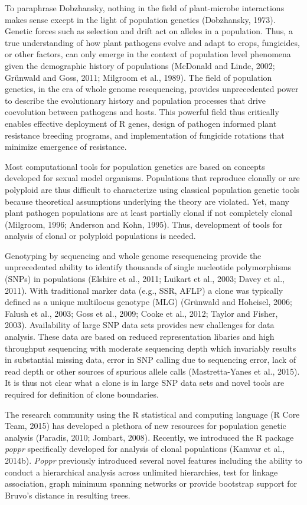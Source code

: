 \documentclass{frontiersSCNS} %
\begin{document}
To paraphrase Dobzhansky, nothing in the field of plant-microbe
interactions makes sense except in the light of population genetics
(Dobzhansky, 1973). Genetic forces such as selection and drift act on
alleles in a population. Thus, a true understanding of how plant
pathogens evolve and adapt to crops, fungicides, or other factors, can
only emerge in the context of population level phenomena given the
demographic history of populations (McDonald and Linde, 2002; Grünwald
and Goss, 2011; Milgroom et al., 1989). The field of population
genetics, in the era of whole genome resequencing, provides
unprecedented power to describe the evolutionary history and population
processes that drive coevolution between pathogens and hosts. This
powerful field thus critically enables effective deployment of R genes,
design of pathogen informed plant resistance breeding programs, and
implementation of fungicide rotations that minimize emergence of
resistance.

Most computational tools for population genetics are based on concepts
developed for sexual model organisms. Populations that reproduce
clonally or are polyploid are thus difficult to characterize using
classical population genetic tools because theoretical assumptions
underlying the theory are violated. Yet, many plant pathogen populations
are at least partially clonal if not completely clonal (Milgroom, 1996;
Anderson and Kohn, 1995). Thus, development of tools for analysis of
clonal or polyploid populations is needed.

Genotyping by sequencing and whole genome resequencing provide the
unprecedented ability to identify thousands of single nucleotide
polymorphisms (SNPs) in populations (Elshire et al., 2011; Luikart et
al., 2003; Davey et al., 2011). With traditional marker data (e.g., SSR,
AFLP) a clone was typically defined as a unique multilocus genotype
(MLG) (Gr{ü}nwald and Hoheisel, 2006; Falush et al., 2003; Goss et al.,
2009; Cooke et al., 2012; Taylor and Fisher, 2003). Availability of
large SNP data sets provides new challenges for data analysis. These
data are based on reduced representation libaries and high throughput
sequencing with moderate sequencing depth which invariably results in
substantial missing data, error in SNP calling due to sequencing error,
lack of read depth or other sources of spurious allele calls
(Mastretta-Yanes et al., 2015). It is thus not clear what a clone is in
large SNP data sets and novel tools are required for definition of clone
boundaries.

The research community using the R statistical and computing language (R
Core Team, 2015) has developed a plethora of new resources for
population genetic analysis (Paradis, 2010; Jombart, 2008). Recently, we
introduced the R package \emph{poppr} specifically developed for
analysis of clonal populations (Kamvar et al., 2014b). \emph{Poppr}
previously introduced several novel features including the ability to
conduct a hierarchical analysis across unlimited hierarchies, test for
linkage association, graph minimum spanning networks or provide
bootstrap support for Bruvo's distance in resulting trees.
\end{document}
